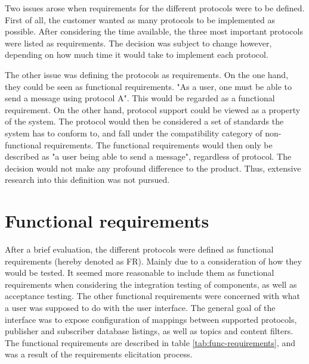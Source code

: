 Two issues arose when requirements for the different protocols were to be defined. First of all, the customer wanted as many protocols to be implemented as possible. After considering the time available, the three most important protocols were listed as requirements. The decision was subject to change however, depending on how much time it would take to implement each protocol.

The other issue was defining the protocols as requirements. On the one hand, they could be seen as functional requirements. "As a user, one must be able to send a message using protocol A". This would be regarded as a functional requirement. On the other hand, protocol support could be viewed as a property of the system. The protocol would then be considered a set of standards the system has to conform to, and fall under the compatibility category of non-functional requirements. The functional requirements would then only be described as "a user being able to send a message", regardless of protocol. The decision would not make any profound difference to the product. Thus, extensive research into this definition was not pursued.

\section{Functional requirements}
\label{sec:requirements_engineering-functional_requirements}

After a brief evaluation, the different protocols were defined as functional requirements (hereby denoted as FR). Mainly due to a consideration of how they would be tested. It seemed more reasonable to include them as functional requirements when considering the integration testing of components, as well as acceptance testing. The other functional requirements were concerned with what a user was supposed to do with the user interface. The general goal of the interface was to expose configuration of mappings between supported protocols, publisher and subscriber database listings, as well as topics and content filters. The functional requirements are described in table \ref{tab:func-requirements}, and was a result of the requirements elicitation process.

